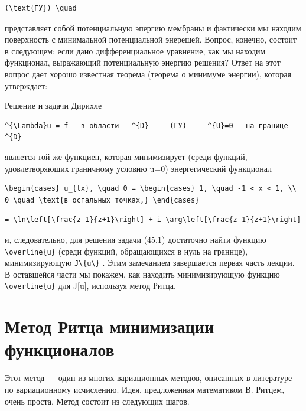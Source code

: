 \documentclass[
  ukrainian,
]{article}
\begin{document}
\begin{verbatim}
(\text{ГУ}) \quad
\end{verbatim}

представляет собой потенциальную эпергию мембраны и фактически мы
находим поверхность с минимальной потенциальной энерешей. Вопрос,
конечно, состоит в следующем: если дано дифференциальное уравнение, как
мы находим функционал, выражающий потенциальную энергию решения? Ответ
на этот вопрос дает хорошо известная теорема (теорема о минимуме
энергии), которая утверждает:

Решение и задачи Дирихле

\begin{verbatim}
^{\Lambda}u = f   в области   ^{D}     (ГУ)     ^{U}=0   на границе   ^{D}
\end{verbatim}

является той же функциен, которая минимизирует (среди функций,
удовлетворяющих граничному условию u=0) энергегический функционал

\begin{verbatim}
\begin{cases} u_{tx}, \quad 0 = \begin{cases} 1, \quad -1 < x < 1, \\ 0 \quad \text{в остальных точках,} \end{cases}
\end{verbatim}

\begin{verbatim}
= \ln\left[\frac{z-1}{z+1}\right] + i \arg\left[\frac{z-1}{z+1}\right]
\end{verbatim}

и, следовательно, для решения задачи (45.1) достаточно найти функцию
\texttt{\textbackslash{}overline\{u\}} (среди функций, обращающихся в
нуль на граннце), минимизирующую
\texttt{J\textbackslash{}\{u\textbackslash{}\}} . Этим замечанием
завершается первая часть лекции. В оставшейся части мы покажем, как
находить минимизирующую функцию \texttt{\textbackslash{}overline\{u\}}
для J{[}u{]}, используя метод Ритца.

\section{Метод Ритца минимизации
функционалов}\label{ux43cux435ux442ux43eux434-ux440ux438ux442ux446ux430-ux43cux438ux43dux438ux43cux438ux437ux430ux446ux438ux438-ux444ux443ux43dux43aux446ux438ux43eux43dux430ux43bux43eux432}

Этот метод --- один из многих вариационных методов, описанных в
литературе по вариационному исчислению. Идея, предложенная математиком
В. Ритцем, очень проста. Метод состоит из следующих шагов.
\end{document}
